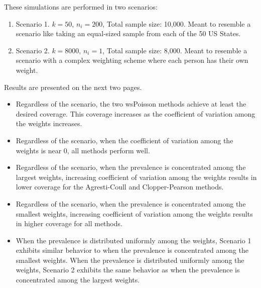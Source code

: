 \documentclass{article}
\begin{document}
These simulations are performed in two scenarios:

\begin{enumerate}
    \item Scenario 1. \( k = 50 \), \( n_i = 200 \), Total sample size: 10,000. Meant to resemble a scenario like taking an equal-sized sample from each of the 50 US States.
    \item Scenario 2. \( k = 8000 \), \( n_i = 1 \), Total sample size: 8,000. Meant to resemble a scenario with a complex weighting scheme where each person has their own weight.
\end{enumerate}

Results are presented on the next two pages.
\begin{itemize}
    \item Regardless of the scenario, the two wsPoisson methods achieve at least the desired coverage. This coverage increases as the coefficient of variation among the weights increases.
    \item Regardless of the scenario, when the coefficient of variation among the weights is near 0, all methods perform well.
    \item Regardless of the scenario, when the prevalence is concentrated among the largest weights, increasing coefficient of variation among the weights results in lower coverage for the Agresti-Coull and Clopper-Pearson methods. 
    \item Regardless of the scenario, when the prevalence is concentrated among the smallest weights, increasing coefficient of variation among the weights results in higher coverage for all methods.
    \item When the prevalence is distributed uniformly among the weights, Scenario 1 exhibits similar behavior to when the prevalence is concentrated among the smallest weights.
    \items When the prevalence is distributed uniformly among the weights, Scenario 2 exhibits the same behavior as when the prevalence is concentrated among the largest weights.
    
\end{itemize}


\begin{landscape}

\end{landscape}
\end{document}
